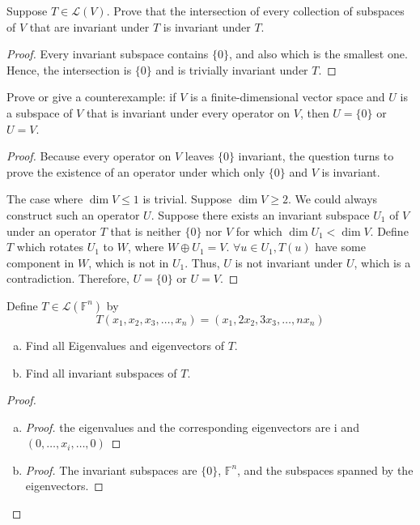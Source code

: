 \newpage

\begin{exercise}
Suppose $T \in \mathcal{L}(V)$. Prove that the intersection of every collection of subspaces of $V$ that are invariant under $T$ is invariant under $T$.
\end{exercise}

\begin{proof}
	Every invariant subspace contains $\{0\}$, and also which is the smallest one. Hence, the intersection is $\{0\}$ and is trivially invariant under $T$.
\end{proof}

\begin{exercise}
Prove or give a counterexample: if $V$ is a finite-dimensional vector space and $U$ is a subspace of $V$ that is invariant under every operator on $V$, then $U = \{0\}$ or $U = V$.
\end{exercise}

\begin{proof}
	Because every operator on $V$ leaves $\{0\}$ invariant, the question turns to prove the existence of an operator under which only $\{0\}$ and $V$ is invariant.

	The case where $\operatorname{dim} V \le 1$ is trivial.
	Suppose $\operatorname{dim} V \ge 2$. We could always construct such an operator $U$. Suppose there exists an invariant subspace $U_1$ of $V$ under an operator $T$ that is neither $\{0\}$ nor $V$ for which $\operatorname{dim} U_1 < \operatorname{dim} V$. Define $T$ which rotates $U_1$ to $W$, where $W \oplus U_1 = V$. $\forall u \in U_1, T(u)$ have some component in $W$, which is not in $U_1$. Thus, $U$ is not invariant under $U$, which is a contradiction. Therefore, $U = \{0\}$ or $U = V$.
\end{proof}

\begin{exercise}
Define $T \in \mathcal{L}(\mathbb{F}^n)$ by \[
	T(x_1,x_2,x_3, \ldots ,x_n) = (x_1,2x_2,3x_3, \ldots ,n x_n)\]
\begin{enumerate}[(a)]
	\item Find all Eigenvalues and eigenvectors of $T$.
	\item Find all invariant subspaces of $T$.
\end{enumerate}
\end{exercise}
\begin{proof}
	\begin{enumerate}[(a)]
		\item
		      \begin{proof}
			      the eigenvalues and the corresponding eigenvectors are i and $(0, \ldots ,x_i, \ldots ,0)$
		      \end{proof}
		\item \begin{proof}
			      The invariant subspaces are $\{0\}$, $\mathbb{F}^n$, and the subspaces spanned by the eigenvectors.
		      \end{proof}
	\end{enumerate}
\end{proof}

